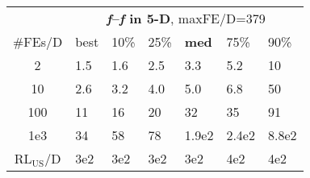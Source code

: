 \begin{tabular}{c|llllll}
 & \multicolumn{6}{|c}{\textbf{\textit{f}\raisebox{-0.35ex}{1}--\textit{f}\raisebox{-0.35ex}{24} in 5-D}, maxFE/D=379}\\
\#FEs/D & best & 10\% & 25\% & \textbf{med} & 75\% & 90\%\\
2 & \hspace*{1ex}1.5 & \hspace*{1ex}1.6 & \hspace*{1ex}2.5 & \hspace*{1ex}3.3 & \hspace*{1ex}5.2 & 10\\
10 & \hspace*{1ex}2.6 & \hspace*{1ex}3.2 & \hspace*{1ex}4.0 & \hspace*{1ex}5.0 & \hspace*{1ex}6.8 & 50\\
100 & 11 & 16 & 20 & 32 & 35 & 91\\
1e3 & 34 & 58 & 78 & 1.9e2 & 2.4e2 & 8.8e2\\
$\text{RL}_{\text{US}}$/D & 3e2 & 3e2 & 3e2 & 3e2 & 4e2 & 4e2
\end{tabular}
